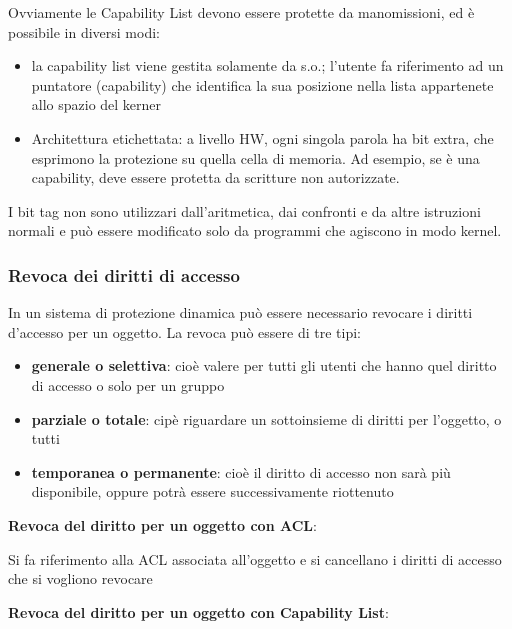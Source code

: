 \documentclass{article}
\begin{document}
\vspace{3mm}
Ovviamente le Capability List devono essere protette da manomissioni, ed è possibile in diversi modi:
\begin{itemize}
    \item la capability list viene gestita solamente da s.o.; l'utente fa riferimento ad un puntatore (capability) che identifica la sua posizione nella lista appartenete allo spazio del kerner
    \item Architettura etichettata: a livello HW, ogni singola parola ha bit extra, che esprimono la protezione su quella cella di memoria. Ad esempio, se è una capability, deve essere
    protetta da scritture non autorizzate.
\end{itemize}

\vspace{3mm}
I bit tag non sono utilizzari dall'aritmetica, dai confronti e da altre istruzioni normali e può essere modificato solo da programmi che agiscono in modo kernel.

\vspace{3mm}
\subsubsection{Revoca dei diritti di accesso}

In un sistema di protezione dinamica può essere necessario revocare i diritti d'accesso per un oggetto. La revoca può essere di tre tipi:
\begin{itemize}
    \item \textbf{generale o selettiva}: cioè valere per tutti gli utenti che hanno quel diritto di accesso o solo per un gruppo
    \item \textbf{parziale o totale}: cipè riguardare un sottoinsieme di diritti per l'oggetto, o tutti
    \item \textbf{temporanea o permanente}: cioè il diritto di accesso non sarà più disponibile, oppure potrà essere successivamente riottenuto
\end{itemize}

\vspace{3mm}
\textbf{Revoca del diritto per un oggetto con ACL}:

Si fa riferimento alla ACL associata all'oggetto e si cancellano i diritti di accesso che si vogliono revocare

\vspace{3mm}
\textbf{Revoca del diritto per un oggetto con Capability List}:
\end{document}
